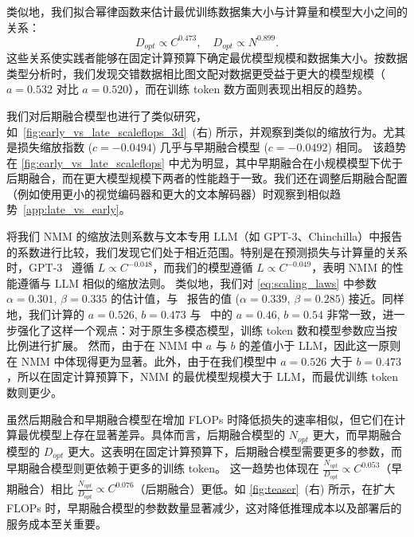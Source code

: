 类似地，我们拟合幂律函数来估计最优训练数据集大小与计算量和模型大小之间的关系：
\[
D_{opt} \propto C^{0.473}, \quad D_{opt} \propto N^{0.899}.
\]
这些关系使实践者能够在固定计算预算下确定最优模型规模和数据集大小。按数据类型分析时，我们发现交错数据相比图文配对数据更受益于更大的模型规模（$a=0.532$ 对比 $a=0.520$），而在训练 token 数方面则表现出相反的趋势。



我们对后期融合模型也进行了类似研究，如~\cref{fig:early_vs_late_scaleflops_3d}~(右) 所示，并观察到类似的缩放行为。尤其是损失缩放指数 ($c = -0.0494$) 几乎与早期融合模型 ($c = -0.0492$) 相同。
该趋势在 \cref{fig:early_vs_late_scaleflops} 中尤为明显，其中早期融合在小规模模型下优于后期融合，而在更大模型规模下两者的性能趋于一致。我们还在调整后期融合配置（例如使用更小的视觉编码器和更大的文本解码器）时观察到相似趋势~\cref{app:late_vs_early}。

\begin{figure}[t!]
    \begin{minipage}[t]{0.48\textwidth}
        
    \end{minipage}
    \hfill
    \begin{minipage}[t]{0.48\textwidth}
        
    \end{minipage}
\end{figure}

将我们 NMM 的缩放法则系数与文本专用 LLM（如 GPT-3、Chinchilla）中报告的系数进行比较，我们发现它们处于相近范围。特别是在预测损失与计算量的关系时，GPT-3~\citep{brown2020language} 遵循 $L \propto C^{-0.048}$，而我们的模型遵循 $L \propto C^{-0.049}$，表明 NMM 的性能遵循与 LLM 相似的缩放法则。
类似地，我们对 \cref{eq:scaling_laws} 中参数 $\alpha=0.301$, $\beta=0.335$ 的估计值，与~\citet{hoffmann2022training} 报告的值 ($\alpha=0.339$, $\beta=0.285$) 接近。同样地，我们计算的 $a=0.526$, $b=0.473$ 与~\citet{hoffmann2022training} 中的 $a=0.46$, $b=0.54$ 非常一致，进一步强化了这样一个观点：对于原生多模态模型，训练 token 数和模型参数应当按比例进行扩展。
然而，由于在 NMM 中 $a$ 与 $b$ 的差值小于 LLM，因此这一原则在 NMM 中体现得更为显著。此外，由于在我们模型中 $a=0.526$ 大于 $b=0.473$，所以在固定计算预算下，NMM 的最优模型规模大于 LLM，而最优训练 token 数则更少。

虽然后期融合和早期融合模型在增加 FLOPs 时降低损失的速率相似，但它们在计算最优模型上存在显著差异。具体而言，后期融合模型的 $N_{opt}$ 更大，而早期融合模型的 $D_{opt}$ 更大。这表明在固定计算预算下，后期融合模型需要更多的参数，而早期融合模型则更依赖于更多的训练 token。
这一趋势也体现在 $\frac{N_{opt}}{D_{opt}} \propto C^{0.053}$（早期融合）相比 $\frac{N_{opt}}{D_{opt}} \propto C^{0.076}$（后期融合）更低。如 \cref{fig:teaser}~(右) 所示，在扩大 FLOPs 时，早期融合模型的参数数量显著减少，这对降低推理成本以及部署后的服务成本至关重要。

